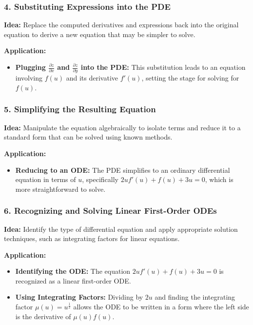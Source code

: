 \documentclass[a4paper,12pt]{book}
\begin{document}
\subsubsection{4. Substituting Expressions into the PDE}

\textbf{Idea:} Replace the computed derivatives and expressions back into the original equation to derive a new equation that may be simpler to solve.

\textbf{Application:}
\begin{itemize}
\item 
\textbf{Plugging \( \frac{\partial z}{\partial x} \) and \( \frac{\partial z}{\partial y} \) into the PDE:} This substitution leads to an equation involving \( f(u) \) and its derivative \( f'(u) \), setting the stage for solving for \( f(u) \).

\end{itemize}

\subsubsection{5. Simplifying the Resulting Equation}

\textbf{Idea:} Manipulate the equation algebraically to isolate terms and reduce it to a standard form that can be solved using known methods.

\textbf{Application:}
\begin{itemize}
\item 
\textbf{Reducing to an ODE:} The PDE simplifies to an ordinary differential equation in terms of \( u \), specifically \( 2u f'(u) + f(u) + 3u = 0 \), which is more straightforward to solve.

\end{itemize}

\subsubsection{6. Recognizing and Solving Linear First-Order ODEs}

\textbf{Idea:} Identify the type of differential equation and apply appropriate solution techniques, such as integrating factors for linear equations.

\textbf{Application:}
\begin{itemize}
\item 
\textbf{Identifying the ODE:} The equation \( 2u f'(u) + f(u) + 3u = 0 \) is recognized as a linear first-order ODE.

\item 
\textbf{Using Integrating Factors:} Dividing by \( 2u \) and finding the integrating factor \( \mu(u) = u^{\frac{1}{2}} \) allows the ODE to be written in a form where the left side is the derivative of \( \mu(u)f(u) \).

\end{itemize}
\end{document}
